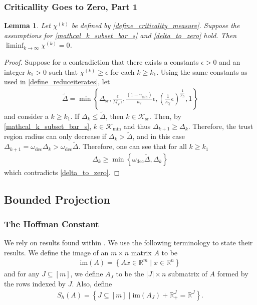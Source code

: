 \documentclass{article}
\newtheorem{lemma}[theorem]{Lemma}
\theoremstyle{case}
\numberwithin{theorem}{subsection}
\newcommand{\chik}{{\chi^{(k)}}}
\newcommand{\dk}{\Delta_k}
\newcommand{\dkpo}{\Delta_{k+1}}
\newcommand{\dsr}{{\Delta_{\textrm{sr}}}}
\newcommand{\gammasm}{\gamma_{\textrm{min}}}
\newcommand{\maxhessian}{{M_{\nabla^2}}}
\newcommand{\omegadec}{\omega_{\text{dec}}}
\newcommand{\reals}{\mathbb R}
\newcommand{\Rm}{\mathbb R^m}
\newcommand{\Rn}{\mathbb R^n}
\newcommand{\image}{{\textrm{im}}}
\newcommand{\miniterates}{{\mathcal K_{\textrm{min}}}}
\newcommand{\reduceiterates}{{\mathcal K_{\textrm{sr}}}}
\newcommand{\theirc}{{\kappa_2}}
\begin{document}
\subsubsection{Criticallity Goes to Zero, Part 1}
\begin{lemma}
\label{liminf_chi_to_zero}
Let $\chik$ be defined by \cref{define_criticality_measure}.
Suppose the assumptions for \cref{mathcal_k_subset_bar_s} and \cref{delta_to_zero} hold.
Then $\liminf_{k\to\infty} \chik = 0$.
\end{lemma}
 

\begin{proof}
Suppose for a contradiction that there exists a constants $\epsilon > 0$ and an integer $k_1 > 0$ such that $\chik \ge \epsilon$ for each $k \ge k_1$.
Using the same constants as used in \cref{define_reduceiterates}, let
\begin{align*}
\tilde \Delta = \min \left\{
\dsr, 
\frac{\epsilon}{\maxhessian}, 
\frac{(1 - \gammasm)}{\theirc} \epsilon,
\left(\frac 1 {\kappa_{\chi}} \epsilon \right)^{\frac 1 {p_{\Delta}}},
1\right\}
\end{align*}
and consider a $k \ge k_1$.
If $\dk \le \tilde \Delta$, then $k \in \reduceiterates$.
Then, by \cref{mathcal_k_subset_bar_s},  $k \in \miniterates$ and thus $\dkpo \ge \dk$.
Therefore, the trust region radius can only decrease if $\dk > \tilde \Delta$, and in this case $\dkpo = \omegadec\dk > \omegadec \tilde \Delta$.
Therefore, one can see that for all $k \ge k_1$
\begin{align}
\dk \ge \min\left\{\omegadec \tilde \Delta, \dk \right\}
\end{align}
which contradicts \cref{delta_to_zero}.
\end{proof}



\subsection{Bounded Projection}
\label{bounding_the_projection_section}

\subsubsection{The Hoffman Constant}

We rely on results found within \cite{pena2020new}.
We use the following terminology to state their results.
We define the image of an $m\times n$ matrix $A$ to be
\begin{align}
\image(A) = \left\{Ax \in \Rm \;|\; x \in \Rn \right\} \label{define_image}
\end{align}
and for any $J \subseteq [m]$, we define $A_J$ to be the $|J| \times n$ submatrix of $A$ 
formed by the rows indexed by $J$.
Also, define 
\begin{align}
S_h(A) = \left\{J \subseteq [m] \; | \; \image(A_J) + \reals_+^J = \reals^J \right\}. \label{define_huff_subsets}
\end{align}
\end{document}
